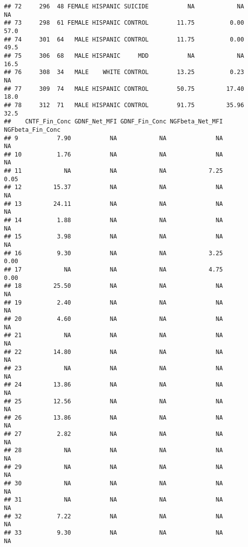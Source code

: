 \documentclass[]{article}
\begin{document}
\begin{verbatim}
## 72     296  48 FEMALE HISPANIC SUICIDE           NA            NA           NA
## 73     298  61 FEMALE HISPANIC CONTROL        11.75          0.00         57.0
## 74     301  64   MALE HISPANIC CONTROL        11.75          0.00         49.5
## 75     306  68   MALE HISPANIC     MDD           NA            NA         16.5
## 76     308  34   MALE    WHITE CONTROL        13.25          0.23           NA
## 77     309  74   MALE HISPANIC CONTROL        50.75         17.40         18.0
## 78     312  71   MALE HISPANIC CONTROL        91.75         35.96         32.5
##    CNTF_Fin_Conc GDNF_Net_MFI GDNF_Fin_Conc NGFbeta_Net_MFI NGFbeta_Fin_Conc
## 9           7.90           NA            NA              NA               NA
## 10          1.76           NA            NA              NA               NA
## 11            NA           NA            NA            7.25             0.05
## 12         15.37           NA            NA              NA               NA
## 13         24.11           NA            NA              NA               NA
## 14          1.88           NA            NA              NA               NA
## 15          3.98           NA            NA              NA               NA
## 16          9.30           NA            NA            3.25             0.00
## 17            NA           NA            NA            4.75             0.00
## 18         25.50           NA            NA              NA               NA
## 19          2.40           NA            NA              NA               NA
## 20          4.60           NA            NA              NA               NA
## 21            NA           NA            NA              NA               NA
## 22         14.80           NA            NA              NA               NA
## 23            NA           NA            NA              NA               NA
## 24         13.86           NA            NA              NA               NA
## 25         12.56           NA            NA              NA               NA
## 26         13.86           NA            NA              NA               NA
## 27          2.82           NA            NA              NA               NA
## 28            NA           NA            NA              NA               NA
## 29            NA           NA            NA              NA               NA
## 30            NA           NA            NA              NA               NA
## 31            NA           NA            NA              NA               NA
## 32          7.22           NA            NA              NA               NA
## 33          9.30           NA            NA              NA               NA

\end{verbatim}
\end{document}
